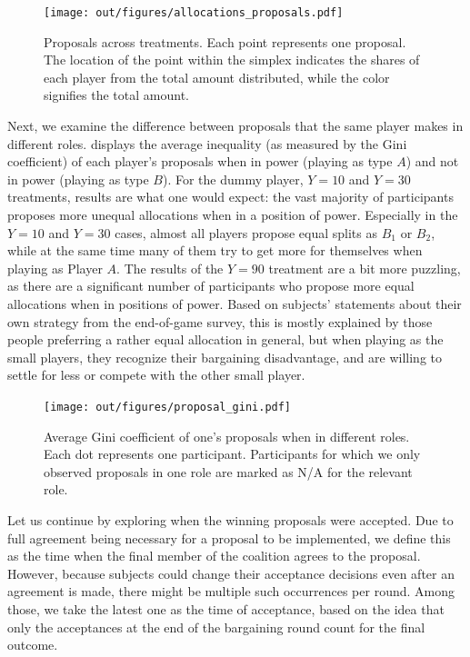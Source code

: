 \documentclass[12pt]{article}
\begin{document}
\begin{figure}
    \centering
    \texttt{[image: out/figures/allocations\_proposals.pdf]}
    \caption{Proposals across treatments. Each point represents one proposal. The location of the point within the simplex indicates the shares of each player from the total amount distributed, while the color signifies the total amount.}
    \label{fig:allocations_proposals}
\end{figure}

Next, we examine the difference between proposals that the same player makes in different roles.  displays the average inequality (as measured by the Gini coefficient) of each player's proposals when in power (playing as type $A$) and not in power (playing as type $B$). For the dummy player, $Y=10$ and $Y=30$ treatments, results are what one would expect: the vast majority of participants proposes more unequal allocations when in a position of power. Especially in the $Y=10$ and $Y=30$ cases, almost all players propose equal splits as $B_1$ or $B_2$, while at the same time many of them try to get more for themselves when playing as Player $A$. The results of the $Y=90$ treatment are a bit more puzzling, as there are a significant number of participants who propose more equal allocations when in positions of power. Based on subjects' statements about their own strategy from the end-of-game survey, this is mostly explained by those people preferring a rather equal allocation in general, but when playing as the small players, they recognize their bargaining disadvantage, and are willing to settle for less or compete with the other small player.

\begin{figure}
    \centering
    \texttt{[image: out/figures/proposal\_gini.pdf]}
    \caption{Average Gini coefficient of one's proposals when in different roles. Each dot represents one participant. Participants for which we only observed proposals in one role are marked as N/A for the relevant role.}
    \label{fig:proposals_gini}
\end{figure}

Let us continue by exploring when the winning proposals were accepted. Due to full agreement being necessary for a proposal to be implemented, we define this as the time when the final member of the coalition agrees to the proposal. However, because subjects could change their acceptance decisions even after an agreement is made, there might be multiple such occurrences per round. Among those, we take the latest one as the time of acceptance, based on the idea that only the acceptances at the end of the bargaining round count for the final outcome.
\end{document}
